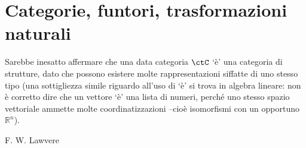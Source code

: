 \chapter{Categorie, funtori, trasformazioni naturali}\label{chap_cat_fun_nat}
\epigraph{
 Sarebbe inesatto affermare che una data categoria $\ctC$ `è' una categoria di strutture, dato che possono esistere molte rappresentazioni siffatte di uno stesso tipo (una sottigliezza simile riguardo all'uso di `è' si trova in algebra lineare: non è corretto dire che un vettore `è' una lista di numeri, perché uno stesso spazio vettoriale ammette molte coordinatizzazioni --cioè isomorfismi con un opportuno $\mathbb{R}^n$).
}{F. W. Lawvere}








